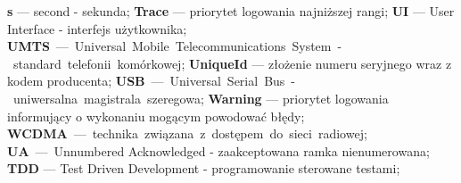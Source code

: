 \textbf{s} --- second - sekunda;\newline
\textbf{Trace} --- priorytet logowania najniższej rangi;\newline
\textbf{UI} --- User Interface - interfejs użytkownika;\newline
\textbf{UMTS} --- Universal Mobile Telecommunications System - standard telefonii komórkowej;\newline
\textbf{UniqueId} --- złożenie numeru seryjnego wraz z kodem producenta;\newline
\textbf{USB} --- Universal Serial Bus - uniwersalna magistrala szeregowa;\newline
\textbf{Warning} --- priorytet logowania informujący o wykonaniu mogącym powodować błędy;\newline
\textbf{WCDMA} --- technika związana z dostępem do sieci radiowej;\newline
\textbf{UA} --- Unnumbered Acknowledged - zaakceptowana ramka nienumerowana;\newline
\textbf{TDD} --- Test Driven Development - programowanie sterowane testami;\newline

